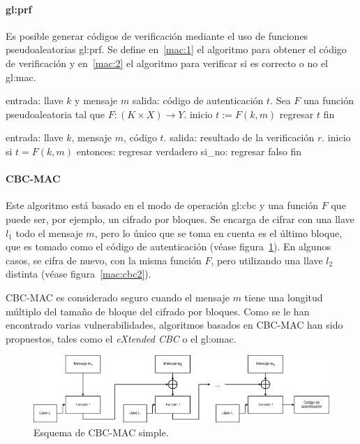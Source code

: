 \paragraph{\texorpdfstring{\acrlong{gl:prf}}{Función pseudoaleatoria}}
Es posible generar códigos de verificación mediante el uso de funciones
pseudoaleatorias \gls{gl:prf}. Se define en~\ref{mac:1} el algoritmo para
obtener el código de verificación y en~\ref{mac:2} el algoritmo para verificar
si es correcto o no el \gls{gl:mac}.

\begin{pseudocodigo}[caption={\gls{gl:mac} mediante \gls{gl:prf}, obtener código.},
  label={mac:1}]
    entrada:    llave $k$ y mensaje $m$
    salida:     código de autenticación $t$.
    Sea $F$ una función pseudoaleatoria tal que $F:(K \times X) \rightarrow Y$.
    inicio
      $t := F(k,m)$
      regresar $t$
    fin
\end{pseudocodigo}

\begin{pseudocodigo}[caption={\gls{gl:mac} mediante \gls{gl:prf}, verificar código.},
  label={mac:2}]
    entrada:    llave $k$, mensaje $m$, código $t$.
    salida:     resultado de la verificación $r$.
    inicio
      si $t = F(k,m)$ entonces:
        regresar verdadero
      si_no:
        regresar falso
    fin
\end{pseudocodigo}

\paragraph{CBC-MAC}
Este algoritmo está basado en el modo de operación \gls{gl:cbc} y una función
$F$ que puede ser, por ejemplo, un cifrado por bloques. Se encarga de
cifrar con una llave $l_1$ todo el mensaje $m$, pero lo único que se toma en
cuenta es el último bloque, que es tomado como el código de autenticación
(véase figura~\ref{mac:cbc1}). En algunos casos, se cifra de nuevo, con la misma
función $F$, pero utilizando una llave $l_2$ distinta (véase
figura~\ref{mac:cbc2}).

CBC-MAC es considerado seguro cuando el mensaje $m$ tiene una longitud
múltiplo del tamaño de bloque del cifrado por bloques. Como se le han
encontrado varias vulnerabilidades, algoritmos basados en CBC-MAC han sido
propuestos, tales como el \textit{eXtended CBC} o el \gls{gl:omac}.

\begin{figure}
  \begin{center}
    \includegraphics[width=0.9\linewidth]{diagramas/cbcmac.png}
    \caption{Esquema de CBC-MAC simple.}
    \label{mac:cbc1}
  \end{center}
\end{figure}

